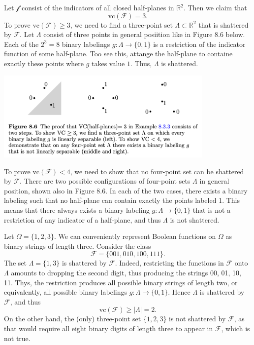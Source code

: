 \begin{example}
\label{ex:8.3.3}
Let $\mathcal{f}$ consist of the indicators of all closed half-planes in $\mathbb{R}^2$. Then we claim that 
\[ \mathrm{vc}(\mathcal{F}) = 3. \]
To prove $\mathrm{vc}(\mathcal{F}) \geq 3$, we need to find a three-point set $\Lambda \subset \mathbb{R}^2$ 
that is shattered by $\mathcal{F}$. Let $\Lambda$ consist of three points in general posiition like in Figure 
8.6 below. Each of the $2^3 = 8$ binary labelings $g: \Lambda \to \{0, 1\}$ is a restriction of the indicator 
function of some half-plane. Too see this, attange the half-plane to containe exactly these points where $g$ 
takes value $1$. Thus, $\Lambda$ is shattered.

\begin{center}
    \includegraphics[width=0.8\textwidth]{Chapter 8/fig8-6.png}
\end{center}

To prove $\mathrm{vc}(\mathcal{F}) < 4$, we need to show that no four-point set can be shattered by 
$\mathcal{F}$. There are two possible configurations of four-point sets $\Lambda$ in general position, shown 
also in Figure 8.6. In each of the two cases, there exists a binary labeling such that no half-plane can contain 
exactly the points labeled 1. This means that there always exists a binary labeling $g: \Lambda \to \{0, 1\}$ 
that is not a restriction of any indicator of a half-plane, and thus $\Lambda$ is not shattered.
\end{example}

\begin{example}[]
\label{ex:8.3.4}
Let $\Omega = \{1, 2, 3\}$. We can conveniently represent Boolean functions on $\Omega$ as binary strings of 
length three. Consider the class 
\[ \mathcal{F} = \{001, 010, 100, 111\}. \]
The set $\Lambda = \{1, 3\}$ is shattered by $\mathcal{F}$. Indeed, restricting the functions in $\mathcal{F}$ 
onto $\Lambda$ amounts to dropping the second digit, thus producing the strings 00, 01, 10, 11. Thys, the 
restriction produces all possible binary strings of length two, or equivalently, all possible binary labelings 
$g: \Lambda \to \{0, 1\}$. Hence $\Lambda$ is shattered by $\mathcal{F}$, and thus 
\[ \mathrm{vc}(\mathcal{F}) \geq |\Lambda| = 2. \]
On the other hand, the (only) three-point set $\{1, 2, 3\}$ is not shattered by $\mathcal{F}$, as that would 
require all eight binary digits of length three to appear in $\mathcal{F}$, which is not true.
\end{example}

